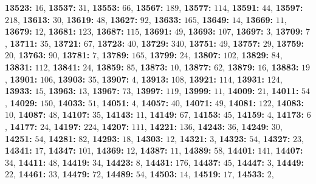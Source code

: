 \textsf{\bfseries 13523:} $16$, \textsf{\bfseries 13537:} $31$, \textsf{\bfseries 13553:} $66$, \textsf{\bfseries 13567:} $189$, \textsf{\bfseries 13577:} $114$, \textsf{\bfseries 13591:} $44$, \textsf{\bfseries 13597:} $218$, \textsf{\bfseries 13613:} $30$, \textsf{\bfseries 13619:} $48$, \textsf{\bfseries 13627:} $92$, \textsf{\bfseries 13633:} $165$, \textsf{\bfseries 13649:} $14$, \textsf{\bfseries 13669:} $11$, \textsf{\bfseries 13679:} $12$, \textsf{\bfseries 13681:} $123$, \textsf{\bfseries 13687:} $115$, \textsf{\bfseries 13691:} $49$, \textsf{\bfseries 13693:} $107$, \textsf{\bfseries 13697:} $3$, \textsf{\bfseries 13709:} $7$, \textsf{\bfseries 13711:} $35$, \textsf{\bfseries 13721:} $67$, \textsf{\bfseries 13723:} $40$, \textsf{\bfseries 13729:} $340$, \textsf{\bfseries 13751:} $49$, \textsf{\bfseries 13757:} $29$, \textsf{\bfseries 13759:} $20$, \textsf{\bfseries 13763:} $90$, \textsf{\bfseries 13781:} $7$, \textsf{\bfseries 13789:} $165$, \textsf{\bfseries 13799:} $24$, \textsf{\bfseries 13807:} $102$, \textsf{\bfseries 13829:} $84$, \textsf{\bfseries 13831:} $112$, \textsf{\bfseries 13841:} $24$, \textsf{\bfseries 13859:} $85$, \textsf{\bfseries 13873:} $10$, \textsf{\bfseries 13877:} $62$, \textsf{\bfseries 13879:} $16$, \textsf{\bfseries 13883:} $19$, \textsf{\bfseries 13901:} $106$, \textsf{\bfseries 13903:} $35$, \textsf{\bfseries 13907:} $4$, \textsf{\bfseries 13913:} $108$, \textsf{\bfseries 13921:} $114$, \textsf{\bfseries 13931:} $124$, \textsf{\bfseries 13933:} $15$, \textsf{\bfseries 13963:} $13$, \textsf{\bfseries 13967:} $73$, \textsf{\bfseries 13997:} $119$, \textsf{\bfseries 13999:} $11$, \textsf{\bfseries 14009:} $21$, \textsf{\bfseries 14011:} $54$, \textsf{\bfseries 14029:} $150$, \textsf{\bfseries 14033:} $51$, \textsf{\bfseries 14051:} $4$, \textsf{\bfseries 14057:} $40$, \textsf{\bfseries 14071:} $49$, \textsf{\bfseries 14081:} $122$, \textsf{\bfseries 14083:} $10$, \textsf{\bfseries 14087:} $48$, \textsf{\bfseries 14107:} $35$, \textsf{\bfseries 14143:} $11$, \textsf{\bfseries 14149:} $67$, \textsf{\bfseries 14153:} $45$, \textsf{\bfseries 14159:} $4$, \textsf{\bfseries 14173:} $6$, \textsf{\bfseries 14177:} $24$, \textsf{\bfseries 14197:} $224$, \textsf{\bfseries 14207:} $111$, \textsf{\bfseries 14221:} $136$, \textsf{\bfseries 14243:} $36$, \textsf{\bfseries 14249:} $30$, \textsf{\bfseries 14251:} $54$, \textsf{\bfseries 14281:} $82$, \textsf{\bfseries 14293:} $18$, \textsf{\bfseries 14303:} $12$, \textsf{\bfseries 14321:} $3$, \textsf{\bfseries 14323:} $54$, \textsf{\bfseries 14327:} $23$, \textsf{\bfseries 14341:} $17$, \textsf{\bfseries 14347:} $101$, \textsf{\bfseries 14369:} $12$, \textsf{\bfseries 14387:} $11$, \textsf{\bfseries 14389:} $58$, \textsf{\bfseries 14401:} $141$, \textsf{\bfseries 14407:} $34$, \textsf{\bfseries 14411:} $48$, \textsf{\bfseries 14419:} $34$, \textsf{\bfseries 14423:} $8$, \textsf{\bfseries 14431:} $176$, \textsf{\bfseries 14437:} $45$, \textsf{\bfseries 14447:} $3$, \textsf{\bfseries 14449:} $22$, \textsf{\bfseries 14461:} $33$, \textsf{\bfseries 14479:} $72$, \textsf{\bfseries 14489:} $54$, \textsf{\bfseries 14503:} $14$, \textsf{\bfseries 14519:} $17$, \textsf{\bfseries 14533:} $2$, 
